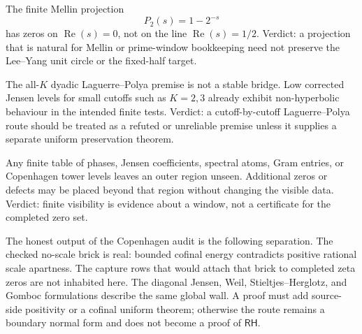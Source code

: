 \begin{principle}
\label{prin:rh-bad-example-mellin-projection}
The finite Mellin projection
$$
P_2(s)=1-2^{-s}
$$
has zeros on $\operatorname{Re}(s)=0$, not on the line
$\operatorname{Re}(s)=1/2$.  Verdict: a projection that is natural for
Mellin or prime-window bookkeeping need not preserve the Lee--Yang unit
circle or the fixed-half target.
\end{principle}

\begin{principle}
\label{prin:rh-bad-example-all-cutoff-dyadic-lp}
The all-$K$ dyadic Laguerre--Polya premise is not a stable bridge.  Low
corrected Jensen levels for small cutoffs such as $K=2,3$ already exhibit
non-hyperbolic behaviour in the intended finite tests.  Verdict: a
cutoff-by-cutoff Laguerre--Polya route should be treated as a refuted or
unreliable premise unless it supplies a separate uniform preservation
theorem.
\end{principle}

\begin{principle}
\label{prin:rh-bad-example-finite-visibility}
Any finite table of phases, Jensen coefficients, spectral atoms, Gram
entries, or Copenhagen tower levels leaves an outer region unseen.
Additional zeros or defects may be placed beyond that region without
changing the visible data.  Verdict: finite visibility is evidence about
a window, not a certificate for the completed zero set.
\end{principle}

\begin{principle}
\label{prin:rh-copenhagen-boundary-verdict}
The honest output of the Copenhagen audit is the following separation.
The checked no-scale brick is real: bounded cofinal energy contradicts
positive rational scale apartness.  The capture rows that would attach
that brick to completed zeta zeros are not inhabited here.  The diagonal
Jensen, Weil, Stieltjes--Herglotz, and Gomboc formulations describe the
same global wall.  A proof must add source-side positivity or a cofinal
uniform theorem; otherwise the route remains a boundary normal form and
does not become a proof of $\mathsf{RH}$.
\end{principle}
